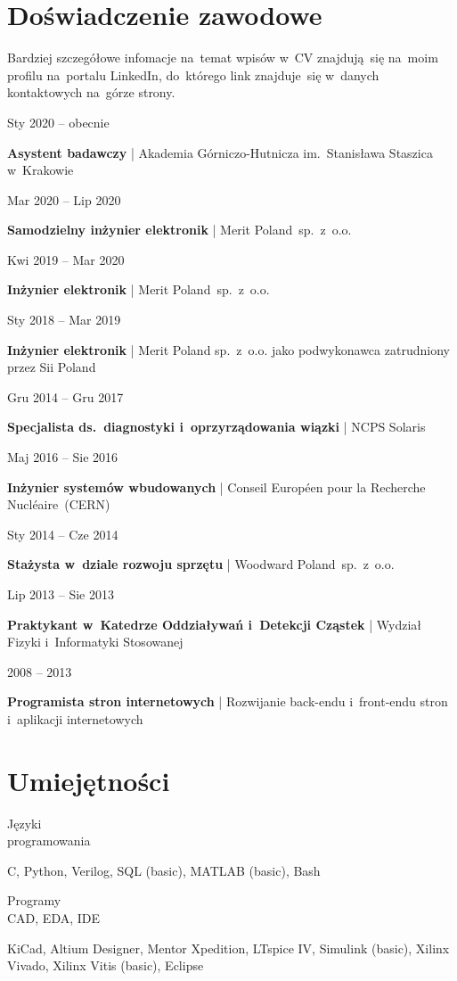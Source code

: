 \documentclass[11pt,a4paper,sans]{article}
\newcommand{\cvexpdateslimitem}[3]{

	\noindent
	\begin{minipage}[t]{0.22\linewidth}
		#1
	\end{minipage}
	\hfill
	\begin{minipage}[t]{0.76\linewidth}
		\begin{flushleft}
			{\bfseries #2} | #3
		\end{flushleft}
	\end{minipage}
	\vspace{.5\baselineskip}

}
\newcommand{\cvskillsitem}[2]{

	\noindent
	\begin{minipage}{0.21\linewidth}
		\begin{flushleft}
			#1
		\end{flushleft}
	\end{minipage}
	\hfill
	\begin{minipage}{0.766\linewidth}

		\begin{flushleft}
			#2
		\end{flushleft}
	\end{minipage}
	\vspace{.65\baselineskip}
}
\begin{document}
	\section{Doświadczenie zawodowe}

  Bardziej szczegółowe infomacje na~temat wpisów w~CV znajdują~się na~moim
  profilu na~portalu LinkedIn, do~którego link znajduje~się w~danych kontaktowych
  na~górze strony.
	\vspace{1\baselineskip}

	\cvexpdateslimitem
		{Sty 2020 -- obecnie}
		{Asystent badawczy}
		{Akademia Górniczo-Hutnicza im.~Stanisława Staszica w~Krakowie}

	\cvexpdateslimitem
		{Mar 2020 -- Lip 2020}
		{Samodzielny inżynier elektronik}
		{Merit Poland~sp.~z~o.o.}

	\cvexpdateslimitem
		{Kwi 2019 -- Mar 2020}
		{Inżynier elektronik}
		{Merit Poland~sp.~z~o.o.}

	\cvexpdateslimitem
		{Sty 2018 -- Mar 2019}
		{Inżynier elektronik}
		{Merit Poland sp.~z~o.o. jako podwykonawca zatrudniony przez Sii Poland}

	\cvexpdateslimitem
		{Gru 2014 -- Gru 2017}
		{Specjalista ds.~diagnostyki i~oprzyrządowania wiązki}
		{NCPS Solaris}

	\cvexpdateslimitem
		{Maj 2016 -- Sie 2016}
		{Inżynier systemów wbudowanych}
		{Conseil Européen pour la Recherche Nucléaire~(CERN)}

	\cvexpdateslimitem
		{Sty 2014 -- Cze 2014}
		{Stażysta w~dziale rozwoju sprzętu}
		{Woodward Poland~sp.~z~o.o.}

	\cvexpdateslimitem
		{Lip 2013 -- Sie 2013}
		{Praktykant w~Katedrze Oddziaływań i~Detekcji Cząstek}
		{Wydział Fizyki i~Informatyki Stosowanej}

	\cvexpdateslimitem
		{2008 -- 2013}
		{Programista stron internetowych}
		{Rozwijanie back-endu i~front-endu stron i~aplikacji internetowych}

	\section{Umiejętności}
	\cvskillsitem
	{Języki\\programowania}
	{C, Python, Verilog, SQL (basic), MATLAB (basic),
	Bash}

	\cvskillsitem
	{Programy\\CAD, EDA, IDE}
	{KiCad, Altium Designer, Mentor Xpedition, LTspice IV, Simulink (basic), Xilinx
	Vivado, Xilinx Vitis (basic), Eclipse}
\end{document}
